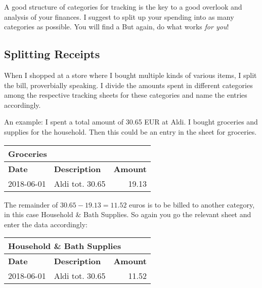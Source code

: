 A good structure of categories for tracking is the key to a good overlook and analysis of your finances.
I suggest to split up your spending into as many categories as possible.
You will find a 
But again, do what works \emph{for you}!

\subsection{Splitting Receipts}

When I shopped at a store where I bought multiple kinds of various items, I split the bill, proverbially speaking.
I divide the amounts spent in different categories among the respective tracking sheets for these categories and name the entries accordingly.

An example: I spent a total amount of 30.65 EUR at Aldi.
I bought groceries and supplies for the household.
Then this could be an entry in the sheet for groceries.
\begin{center}\sffamily
	\begin{tabular}{|l|l|r|}
		\multicolumn{3}{l}{Groceries}\\
		\hline
		\textbf{Date} & \textbf{Description} & \textbf{Amount}\rmfamily\\
		\hline
		2018-06-01 & Aldi tot. 30.65 & 19.13\\
		\hline
	\end{tabular}
\end{center}
The remainder of \( 30.65 - 19.13 = 11.52 \) euros is to be billed to another category, in this case Household \& Bath Supplies.
So again you go the relevant sheet and enter the data accordingly:
\begin{center}\sffamily
	\begin{tabular}{|l|l|r|}
		\multicolumn{3}{l}{Household \& Bath Supplies}\\			
		\hline
		\textbf{Date} & \textbf{Description} & \textbf{Amount}\\
		\hline
		2018-06-01 & Aldi tot. 30.65 & 11.52\\
		\hline
	\end{tabular}
\end{center}

